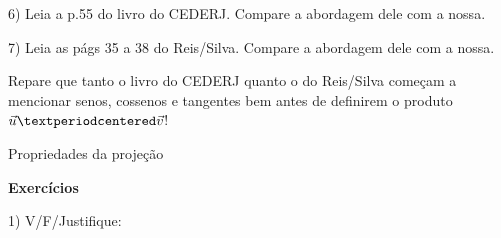 \documentclass[oneside]{book}
\begin{document}
\bsk

6) Leia a p.55 do livro do CEDERJ. Compare a abordagem dele com a nossa.

7) Leia as págs 35 a 38 do Reis/Silva. Compare a abordagem dele com a
nossa.

Repare que tanto o livro do CEDERJ quanto o do Reis/Silva começam a
mencionar senos, cossenos e tangentes bem antes de definirem o produto
$\uu·\vv$!






\newpage

%
 {Propriedades da projeção}

{\bf Exercícios}

\ssk

1) V/F/Justifique:
\end{document}
